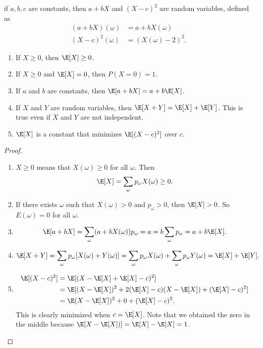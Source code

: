 \documentclass[a4paper]{article}
\begin{document}
\begin{eg}
  if $a, b, c$ are constants, then $a + bX$ and $(X - c)^2$ are random variables, defined as
  \begin{align*}
    (a + bX)(\omega) &= a + bX(\omega)\\
    (X - c)^2(\omega) &= (X(\omega) - 2)^2.
  \end{align*}
\end{eg}

\begin{thm}\leavevmode
\begin{enumerate}
  \item If $X \geq 0$, then $\E[X] \geq 0$.
  \item If $X\geq 0$ and $\E[X] = 0$, then $P(X = 0) = 1$.
  \item If $a$ and $b$ are constants, then $\E[a + bX] = a + b\E[X]$.
  \item If $X$ and $Y$ are random variables, then $\E[X + Y] = \E[X] + \E[Y]$. This is true even if $X$ and $Y$ are not independent.
  \item $\E[X]$ is a constant that minimizes $\E[(X - c)^2]$ over $c$.
\end{enumerate}
\end{thm}
\begin{proof}\leavevmode
  \begin{enumerate}
    \item $X \geq 0$ means that $X(\omega) \geq 0$ for all $\omega$. Then
      \[
        \E[X] = \sum_\omega p_\omega X(\omega) \geq 0.
      \]
    \item If there exists $\omega$ such that $X(\omega) > 0$ and $p_\omega > 0$, then $\E[X] > 0$. So $E(\omega) = 0$ for all $\omega$.
    \item
      \[
        \E[a + bX] = \sum_\omega (a + bX(\omega))p_\omega = a = b\sum_\omega p_\omega= a + b\E[X].
      \]
    \item
      \[
        \E[X + Y] = \sum_\omega p_\omega[X(\omega) + Y(\omega)] = \sum_\omega p_\omega X(\omega) + \sum_\omega p_\omega Y(\omega) = \E[X] + \E[Y].
      \]
    \item
      \begin{align*}
        \E[(X - c)^2] &= \E[(X - \E[X] + \E[X] - c)^2]\\
        &= \E[(X - \E[X])^2 + 2(\E[X] - c)(X - \E[X]) + (\E[X] - c)^2]\\
        &= \E(X - \E[X])^2 + 0 + (\E[X] - c)^2.
      \end{align*}
      This is clearly minimized when $c = \E[X]$. Note that we obtained the zero in the middle because $\E[X - \E[X])] = \E[X] - \E[X] = 1$.
  \end{enumerate}
\end{proof}
\end{document}
